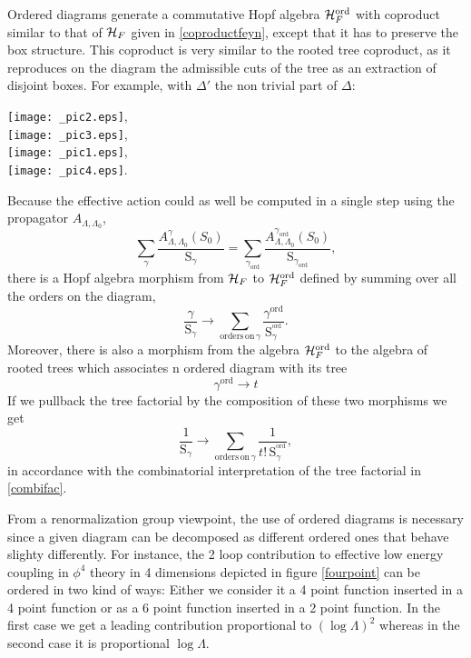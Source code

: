 \documentclass[10pt,here,feynmf]{article}
\begin{document}
Ordered diagrams generate a commutative Hopf algebra
${\cal H}_{F}^{\mathrm{ord}}$ with coproduct similar to
that of ${\cal H}_{F}$ given in \eqref{coproductfeyn}, except that it has to preserve the box structure. This coproduct is very similar to the rooted tree coproduct, as it reproduces on the diagram the admissible cuts of the tree as an extraction of disjoint boxes. For example, with $\Delta'$ the non trivial part of
$\Delta$:
\begin{center}
\texttt{[image: \_pic2.eps]},\\
\texttt{[image: \_pic3.eps]},\\
\texttt{[image: \_pic1.eps]},\\
\texttt{[image: \_pic4.eps]}.\\
\end{center}
Because the effective action could as well be computed in a single step using the propagator $A_{\Lambda,\Lambda_{0}}$, 
\begin{equation}
\sum_{\gamma}\frac{A_{\Lambda,\Lambda_{0}}^{\gamma}(S_{0})}{\mathrm{S}_{\gamma}}
=\sum_{\gamma_{\mathrm{ord}}}\frac{A_{\Lambda,\Lambda_{0}}^{\gamma_{\mathrm{ord}}}(S_{0})}{\mathrm{S}_{\gamma_{\mathrm{ord}}}},
\end{equation}
there is a Hopf algebra morphism from ${\cal H}_{F}$ to ${\cal H}_{F}^{\mathrm{ord}}$ defined by summing over all the orders on the diagram,
\begin{equation}
\frac{\gamma}{{\mathrm{S}}_{\gamma}}\rightarrow
\mathop{\sum}\limits_{\mathrm{ orders\, on}\,\gamma}
\frac{\gamma^{\mathrm{ord}}}{{\mathrm{
S}}_{\gamma}^{^{\mathrm{ord}}}}.
\end{equation}
Moreover, there is also a morphism from the algebra ${\cal H}_{F}^{\mathrm{ord}}$ to the algebra of rooted trees which associates n ordered diagram with its tree
\begin{equation}
\gamma^{\mathrm{ord}}\rightarrow t
\end{equation}
If we pullback  the tree factorial by the composition of these two morphisms we get
\begin{equation}
\frac{1}{{\mathrm{S}}_{\gamma}}\rightarrow
\mathop{\sum}\limits_{\mathrm{ orders\, on}\,\gamma}
\frac{1}{t!\,{\mathrm{
S}}_{\gamma}^{^{\mathrm{ord}}}},
\end{equation}
in accordance with the combinatorial interpretation of the tree factorial in \eqref{combifac}.


From a renormalization group viewpoint, the use of ordered diagrams is necessary since a given diagram can be decomposed as different ordered ones that behave slighty differently.  For instance, the 2 loop contribution to effective low energy coupling in $\phi^{4}$ theory in 4 dimensions depicted in figure \ref{fourpoint} can be ordered in two kind of ways: Either we consider it a 4 point function inserted in a 4 point function or as a 6 point function inserted in a 2 point function. In the first case we get a leading contribution proportional to $(\log\Lambda)^{2}$ whereas in the second case it is proportional $\log\Lambda$. 
\end{document}
